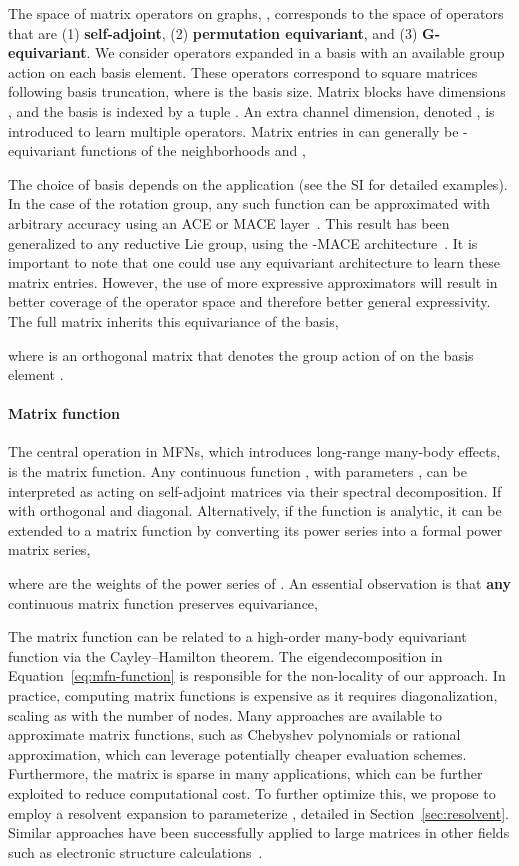 \documentclass{article} \usepackage{iclr2024_conference,times}
\begin{document}
The space of matrix operators on graphs, , corresponds to the space of operators that are (1) \textbf{self-adjoint}, (2) \textbf{permutation equivariant}, and (3) \textbf{G-equivariant}. 
We consider operators expanded in a basis  with an available group action on each basis element. These operators correspond to square matrices  following basis truncation, where  is the basis size. Matrix blocks  have dimensions , and the basis is indexed by a tuple . An extra channel dimension, denoted , is introduced to learn multiple operators. Matrix entries in  can generally be -equivariant functions of the neighborhoods  and ,

The choice of basis  depends on the application (see the SI for detailed examples).
In the case of the rotation group, any such function can be approximated with arbitrary accuracy using an ACE or MACE layer~\citep{2021-acetb1, Batatia2022mace}.
This result has been generalized to any reductive Lie group, using the -MACE architecture~\citep{batatia2023general}. It is important to note that one could use any equivariant architecture to learn these matrix entries. However, the use of more expressive approximators will result in better coverage of the operator space  and therefore better general expressivity.
The full matrix inherits this equivariance of the basis, 

where  is an orthogonal matrix that denotes the group action of  on the basis element .


\paragraph{Matrix function}
The central operation in MFNs, which introduces long-range many-body effects, is the matrix function.
Any continuous function , with parameters , can be interpreted as acting on self-adjoint matrices  via their spectral decomposition. If  with  orthogonal and  diagonal. Alternatively, if the function is analytic, it can be extended to a matrix function by converting its power series into a formal power matrix series,

where  are the weights of the power series of . 
An essential observation is that \textbf{any} continuous matrix function  preserves equivariance, 

The matrix function can be related to a high-order many-body equivariant function via the Cayley--Hamilton theorem.
The eigendecomposition in Equation~\ref{eq:mfn-function} is responsible for the non-locality of our approach. 
In practice, computing matrix functions is expensive as it requires diagonalization, scaling as  with the number of nodes. 
Many approaches are available to approximate matrix functions, such as Chebyshev polynomials or rational approximation, which can leverage potentially cheaper evaluation schemes.
Furthermore, the matrix  is sparse in many applications, which can be further exploited to reduce computational cost. 
To further optimize this, we propose to employ a resolvent expansion to parameterize , detailed in Section~\ref{sec:resolvent}. Similar approaches have been successfully applied to large matrices in other fields such as electronic structure calculations~\citep{pexsi_CMS2009,pexsi_JCPM2013}.
\end{document}

